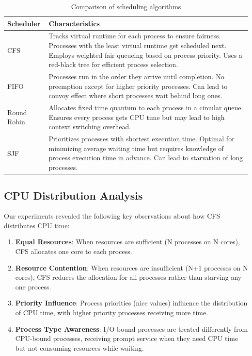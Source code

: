 \documentclass[12pt,a4paper]{article}
\begin{document}
\begin{table}[H]
\centering
\begin{tabular}{|p{2.5cm}|p{11cm}|}
\hline
\textbf{Scheduler} & \textbf{Characteristics} \\
\hline
CFS & Tracks virtual runtime for each process to ensure fairness. Processes with the least virtual runtime get scheduled next. Employs weighted fair queueing based on process priority. Uses a red-black tree for efficient process selection. \\
\hline
FIFO & Processes run in the order they arrive until completion. No preemption except for higher priority processes. Can lead to convoy effect where short processes wait behind long ones. \\
\hline
Round Robin & Allocates fixed time quantum to each process in a circular queue. Ensures every process gets CPU time but may lead to high context switching overhead. \\
\hline
SJF & Prioritizes processes with shortest execution time. Optimal for minimizing average waiting time but requires knowledge of process execution time in advance. Can lead to starvation of long processes. \\
\hline
\end{tabular}
\caption{Comparison of scheduling algorithms}
\label{tab:scheduler_comparison}
\end{table}

\subsection{CPU Distribution Analysis}

Our experiments revealed the following key observations about how CFS distributes CPU time:

\begin{enumerate}
    \item \textbf{Equal Resources}: When resources are sufficient (N processes on N cores), CFS allocates one core to each process.
    
    \item \textbf{Resource Contention}: When resources are insufficient (N+1 processes on N cores), CFS reduces the allocation for all processes rather than starving any one process.
    
    \item \textbf{Priority Influence}: Process priorities (nice values) influence the distribution of CPU time, with higher priority processes receiving more time.
    
    \item \textbf{Process Type Awareness}: I/O-bound processes are treated differently from CPU-bound processes, receiving prompt service when they need CPU time but not consuming resources while waiting.
\end{enumerate}
\end{document}
